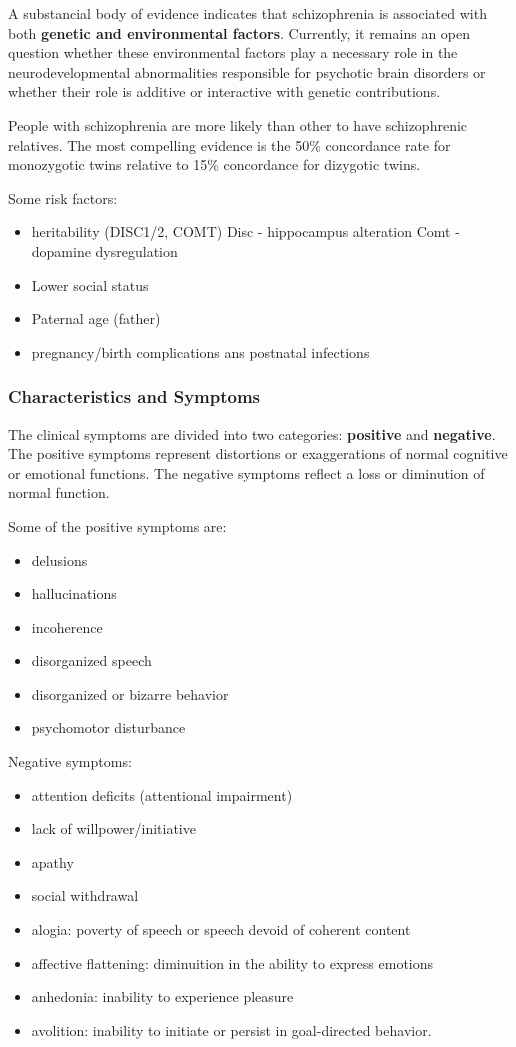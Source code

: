 \documentclass[12pt,article,oneside,a4paper]{memoir}
\begin{document}
A substancial body of evidence indicates that schizophrenia is associated with
both \textbf{genetic and environmental factors}. Currently, it remains an open 
question whether these environmental factors play a necessary role in the
neurodevelopmental abnormalities responsible for psychotic brain disorders or 
whether their role is additive or interactive with genetic contributions.

People with schizophrenia are more likely than other to have schizophrenic 
relatives. The most compelling evidence is the 50\% concordance rate for
monozygotic twins relative to 15\% concordance for dizygotic twins.

Some risk factors:
\begin{itemize}
\item heritability (DISC1/2, COMT)
\subitem Disc - hippocampus alteration
\subitem Comt - dopamine dysregulation
\item Lower social status
\item Paternal age (father)
\item pregnancy/birth complications ans postnatal infections
\end{itemize}

\subsubsection{Characteristics and Symptoms}

The clinical symptoms are divided into two categories: \textbf{positive} and
\textbf{negative}. The positive symptoms represent distortions or exaggerations
of normal cognitive or emotional functions. The negative symptoms reflect a
loss or diminution of normal function.

Some of the positive symptoms are:
\begin{itemize}
\item delusions
\item hallucinations
\item incoherence
\item disorganized speech
\item disorganized or bizarre behavior
\item psychomotor disturbance
\end{itemize}

Negative symptoms:
\begin{itemize}
\item attention deficits (attentional impairment)
\item lack of willpower/initiative
\item apathy
\item social withdrawal
\item alogia: poverty of speech or speech devoid of coherent content
\item affective flattening: diminuition in the ability to express emotions
\item anhedonia: inability to experience pleasure
\item avolition: inability to initiate or persist in goal-directed behavior.
\end{itemize}
\end{document}
